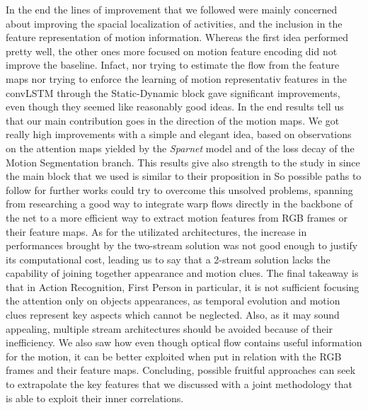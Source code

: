 \documentclass[10pt,twocolumn,hidelinks,letterpaper]{article}
\begin{document}
In the end the lines of improvement that we followed were mainly concerned about
improving the spacial localization of activities, and the inclusion in the
feature representation of motion information. Whereas the first idea performed
pretty well, the other ones more focused on motion feature encoding did not improve the baseline. Infact, nor trying to estimate the flow from the feature maps nor trying to enforce the learning of motion representativ features in the convLSTM through the Static-Dynamic block gave significant improvements, even though they seemed like reasonably good ideas.
In the end results tell us that our main contribution goes in the direction of the motion maps. We got really high improvements with a simple and elegant idea, based on observations on the attention maps yielded by the \textit{Sparnet} model and of the loss decay of the Motion Segmentation branch. This results give also strength to the study in \cite{sparnet} since the main block that we used is similar to their proposition in \cite{sparnet}
So possible paths to follow for further works could try to overcome this unsolved problems, spanning from researching a good way to integrate warp flows directly in the backbone of the net to a more efficient way to extract motion features from RGB frames or their feature maps.
As for the utilizated architectures, the increase in performances brought by the two-stream solution was not good enough to justify its computational cost, leading us to say that a 2-stream solution lacks the capability of joining together appearance and motion clues.
The final takeaway is that in Action Recognition, First Person in particular, it is not sufficient focusing the attention only on objects appearances, as temporal evolution
and motion clues represent key aspects which cannot be neglected. Also, as it may sound
appealing, multiple stream architectures should be avoided because of their inefficiency.
We also saw how even though optical flow contains useful information for the motion, it can be better exploited when put in relation with the RGB frames and their feature maps.
Concluding, possible fruitful approaches can seek to extrapolate the key features that we discussed with a joint methodology that is able to exploit their inner correlations.



{\small


}
\end{document}
